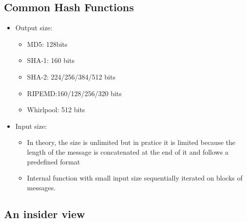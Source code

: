 
\subsection{Common Hash Functions}
\begin{itemize}
    \item Output size:
    \begin{itemize}
        \item MD5: 128bits
        \item SHA-1: 160 bits
        \item SHA-2: 224/256/384/512 bits
        \item RIPEMD:\@160/128/256/320 bits
        \item Whirlpool: 512 bits
    \end{itemize}
    \item Input size:
    \begin{itemize}
        \item In theory, the size is unlimited but in pratice it is limited
        because the length of the message is concatenated at the end of it and
        follows a predefined format
        \item Internal function with small input size sequentially iterated on
        blocks of messages.
    \end{itemize}
\end{itemize}

\subsection{An insider view}
\begin{figure}[ht!]
    \centering
\end{figure}

